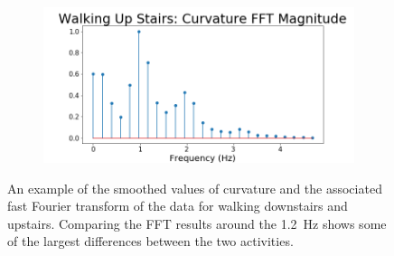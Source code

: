 \begin{figure}[ht]
\begin{subfigure}{.5\textwidth}
    \caption{}
    \label{fig:walkup_scurv}
\end{subfigure}
\begin{subfigure}{.5\textwidth}
    \includegraphics[width = \textwidth]{images/smooth/Walking Up Stairs curvatureFFT_ma.png}
    \caption{}
    \label{fig:walkup_scur_fft}
\end{subfigure}
\caption{An example of the smoothed values of curvature and the associated fast Fourier transform of the data for walking downstairs and upstairs. Comparing the FFT results around the \SI{1.2 }{\Hz} shows some of the largest differences between the two activities.}
\label{fig:curv_smooth}
\end{figure}

